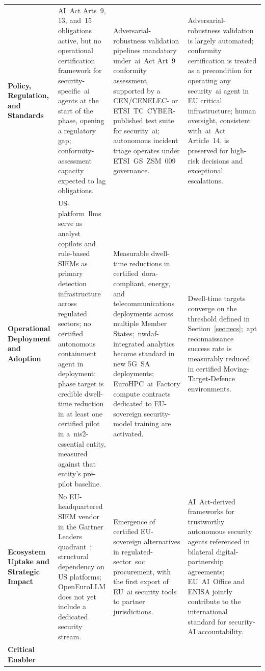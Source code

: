 \documentclass{ieeeaccess}
\begin{document}
\begin{table}[t]
\begin{tabularx}{\textwidth}{@{}>{\bfseries}p{} X X X@{}}
\addlinespace[2pt]
Policy, Regulation, and Standards &
AI~Act Arts~9, 13, and~15 obligations active, but no operational certification framework for security-specific~\gls{ai} agents at the start of the phase, opening a regulatory gap; conformity-assessment capacity expected to lag obligations. &
Adversarial-robustness validation pipelines mandatory under~\gls{ai}~Act Art~9 conformity assessment, supported by a CEN/CENELEC- or ETSI~TC~CYBER-published test suite for security~\gls{ai}; autonomous incident triage operates under ETSI~GS~ZSM~009 governance. &
Adversarial-robustness validation is largely automated; conformity certification is treated as a precondition for operating any security~\gls{ai} agent in EU critical infrastructure; human oversight, consistent with~\gls{ai}~Act Article~14, is preserved for high-risk decisions and exceptional escalations. \\
\addlinespace[2pt]
Operational Deployment and Adoption &
US-platform~\glspl{llm} serve as analyst copilots and rule-based SIEMs as primary detection infrastructure across regulated sectors; no certified autonomous containment agent in deployment; phase target is credible dwell-time reduction in at least one certified pilot in a~\gls{nis2}-essential entity, measured against that entity's pre-pilot baseline. &
Measurable dwell-time reductions in certified~\gls{dora}-compliant, energy, and telecommunications deployments across multiple Member States;~\gls{nwdaf}-integrated analytics become standard in new 5G~SA deployments; EuroHPC~\gls{ai}~Factory compute contracts dedicated to EU-sovereign security-model training are activated. &
Dwell-time targets converge on the threshold defined in Section~\ref{sec:recs};~\gls{apt} reconnaissance success rate is measurably reduced in certified Moving-Target-Defence environments. \\
\addlinespace[2pt]
Ecosystem Uptake and Strategic Impact &
No EU-headquartered SIEM vendor in the Gartner Leaders quadrant~\cite{gartner2025siem}; structural dependency on US platforms; OpenEuroLLM does not yet include a dedicated security stream. &
Emergence of certified EU-sovereign alternatives in regulated-sector~\gls{soc} procurement, with the first export of EU~\gls{ai} security tools to partner jurisdictions. &
AI~Act-derived frameworks for trustworthy autonomous security agents referenced in bilateral digital-partnership agreements; EU~AI~Office and ENISA jointly contribute to the international standard for security-AI accountability. \\
\midrule
\textbf{Critical Enabler} &

\end{tabularx}
\end{table}
\end{document}
